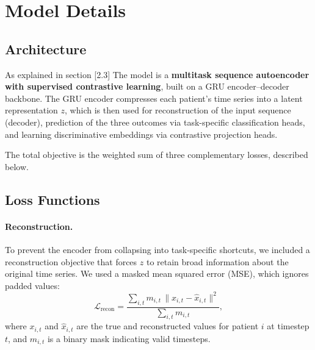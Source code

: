 \documentclass{article}
\theoremstyle{plain}
\theoremstyle{definition}
\theoremstyle{remark}
\begin{document}




\newpage
\appendix
\section{Model Details}

\subsection{Architecture}

As explained in section [2.3] The model is a \textbf{multitask sequence autoencoder with supervised contrastive learning}, 
built on a GRU encoder--decoder backbone. The GRU encoder compresses each patient’s 
time series into a latent representation $z$, which is then used for reconstruction of the input sequence (decoder), prediction of the three outcomes via task-specific classification heads, and learning discriminative embeddings via contrastive projection heads.

The total objective is the weighted sum of three complementary losses, described below.

\subsection{Loss Functions}

\paragraph{Reconstruction.}  
To prevent the encoder from collapsing into task-specific shortcuts, we included 
a reconstruction objective that forces $z$ to retain broad information about the 
original time series. We used a masked mean squared error (MSE), which ignores padded values:
\[
    \mathcal{L}_{\text{recon}} = 
    \frac{\sum_{i,t} m_{i,t}\,\|x_{i,t} - \hat{x}_{i,t}\|^2}{\sum_{i,t} m_{i,t}} ,
\]
where $x_{i,t}$ and $\hat{x}_{i,t}$ are the true and reconstructed values for patient $i$ at timestep $t$, 
and $m_{i,t}$ is a binary mask indicating valid timesteps.
\end{document}
